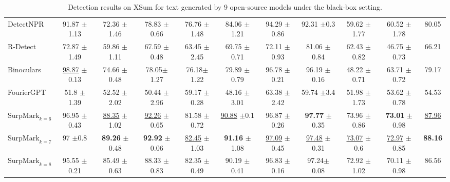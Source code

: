 \documentclass{article}
\newcommand{\com}[1]{\tiny$\pm$#1}
\theoremstyle{plain}
\theoremstyle{definition}
\theoremstyle{remark}
\begin{document}
\begin{table}[htbp]
{{\begin{tabular}{lcccccccccc}
DetectNPR & 91.87 \com 1.13 & 72.36 \com 1.46 & 78.83 \com 0.66 & 76.76 \com 1.48 & 84.06 \com 1.21 & 94.29 \com 0.86 & 92.31  \com 0.3& 59.62 \com 1.77 & 60.52 \com 1.78 & 80.05 \\

R-Detect & 72.87 \com 1.49 & 59.86 \com 1.11 & 67.59 \com 0.48 & 63.45 \com 2.45 &  69.75 \com 0.71 & 72.11 \com 0.93 & 81.06  \com 0.84 & 62.43 \com 0.82 & 46.75 \com 0.73 & 66.21  \\

Binoculars &  \underline{98.87} \com 0.13 &  74.66 \com 0.48 &  78.05\com 1.27 & 76.18\com 1.22 & 79.89 \com 0.79 &  96.78 \com 0.21 & 96.19  \com 0.16& 48.22 \com 0.71 & 63.71 \com0.72 & 79.17 \\

FourierGPT & 51.8  \com 1.39 &  52.52 \com 2.02 &  50.44 \com 2.96 &  59.17 \com 0.28 & 48.16 \com 3.01 & 63.38 \com 2.42 & 59.74  \com 3.4 & 51.98 \com 1.73 & 53.62 \com 0.78 & 54.53 \\

\rowcolor{ours}$\text{SurpMark}_{k=6}$ & 96.95 \com 0.43 & \underline{88.35} \com 1.02 & \underline{92.26} \com 0.65  & 81.58 \com 0.72 & \underline{90.88} \com 0.1 & 96.87 \com 0.26 & \textbf{97.77} \com 0.35 & {73.96} \com 0.86 & \textbf{73.01} \com 0.98 & \underline{87.96} \\

\rowcolor{ours}$\text{SurpMark}_{k=7}$ & {97} \com 0.8 & \textbf{89.26} \com 0.48 & \textbf{92.92} \com 0.06 & \underline{82.45} \com 1.03 & \textbf{91.16} \com 1.08 & \underline{97.09} \com 0.45  & \underline{97.48} \com 0.31 & \underline{73.07} \com 0.6 & \underline{72.97} \com 0.85 & \textbf{88.16} \\
\rowcolor{ours}$\text{SurpMark}_{k=8}$ & 95.55 \com 0.21 & 85.49 \com 0.63 & 88.33 \com 0.83 & 82.35 \com 0.49 & 90.19 \com 0.41 & 96.83 \com 0.16 & 97.24\com 0.08 & 72.92 \com 1.02 & 70.11 \com 0.98 & 86.56 \\
\bottomrule
\end{tabular}}}
\caption{Detection results on XSum for text generated by 9 open-source models under the black-box setting.}
\label{tab:opensource-xsum}
\end{table}
\end{document}
